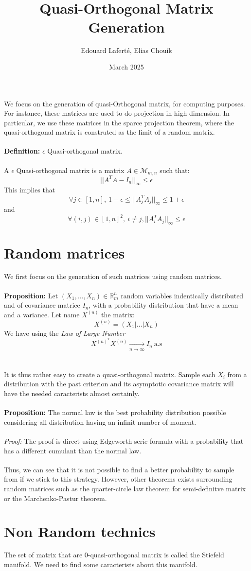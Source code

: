\documentclass{article}
\title{Quasi-Orthogonal Matrix Generation}
\author{Edouard Laferté, Elias Chouik}
\date{March 2025}
\begin{document}
\maketitle

We focus on the generation of quasi-Orthogonal matrix, for computing purposes. For instance,
these matrices are used to do projection in high dimension. In particular, we use these matrices
in the sparce projection theorem, where the quasi-orthogonal matrix is construted as the limit of
a random matrix.
\\
\\
\textbf{Definition: }$\epsilon$ Quasi-orthogonal matrix.
\\
\\
A $\epsilon$ Quasi-orthogonal matrix is a matrix $A\in \mathcal M_{m,n}$ such that:
$$||A^TA-I_{n}||_{\infty}\leq \epsilon$$
This implies that $$\forall j \in [1,n], \ 1-\epsilon \leq ||A_j^TA_j||_{\infty}\leq 1+\epsilon$$
and $$\forall (i,j) \in [1,n]^2, \ i\neq j, ||A_i^TA_j||_{\infty}\leq \epsilon$$

\section{Random matrices}
We first focus on the generation of such matrices using random matrices.
\\
\\
\textbf{Proposition:}
Let $(X_1,...,X_n)\in \mathbb R^n_m$ random variables indentically distributed and of covariance matrice $I_n$, with a 
probability distribution that have a mean and a variance.
Let name $X^{(n)}$ the matrix:
$$X^{(n)} = (X_1|\dots|X_n)$$
We have using the \textit{Law of Large Number}
$$X^{(n)}^TX^{(n)}\underset{n \xrightarrow{} \infty}{\xrightarrow{}} I_n \ \text{a.s}$$
\\
\\
It is thus rather easy to create a quasi-orthogonal matrix. Sample each $X_i$ from a distribution with the past criterion
and its asymptotic covariance matrix will have the needed caracterists almost certainly.
\\
\\
\textbf{Proposition:}
The normal law is the best probability distribution possible considering all distribution having an infinit number of moment.
\\
\\
\textit{Proof:}
The proof is direct using Edgeworth serie formula with a probability that has a different cumulant than the normal law.
\\
\\
Thus, we can see that it is not possible to find a better probability to sample from if we stick to this strategy. However,
other theorems exists surrounding random matrices such as the quarter-circle law theorem for semi-definitve matrix or the
Marchenko-Pastur theorem.
\section{Non Random technics}
The set of matrix that are $0$-quasi-orthogonal matrix is called the Stiefeld manifold. We need to find some caracterists about this
manifold.
\end{document}
